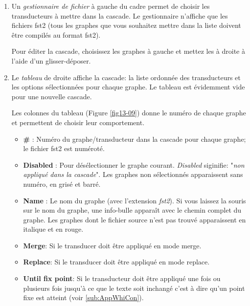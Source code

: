 \begin{enumerate}
	\item Un \textit{gestionnaire de fichier} à gauche du cadre permet de choisir les transducteurs à mettre dans la cascade.
	Le gestionnaire n'affiche que les fichiers fst2 (tous les graphes que vous souhaitez mettre dans la liste doivent être compilés au format fst2).
	
	Pour éditer la cascade, choisissez les graphes à gauche et mettez les à droite à l'aide d'un glisser-déposer.
\item Le \textit{tableau} de droite affiche la cascade: la liste ordonnée des transducteurs et les options sélectionnées pour chaque graphe.
		Le tableau est évidemment vide pour une nouvelle cascade.
		 
		Les colonnes du tableau (Figure \ref{fig13-09}) donne le numéro de chaque graphe et permettent de choisir leur comportement.
	\begin{itemize}
	\item \textbf{\#} : Numéro du graphe/transducteur dans la cascade pour chaque graphe; le fichier fst2 est numéroté.
	\item \textbf{Disabled} : Pour désélectionner le graphe courant. \textit{Disabled} siginifie: "\textit{non appliqué dans la cascade}".
		Les graphes non sélectionnés apparaissent sans numéro, en grisé et barré.
	\item \textbf{Name} : Le nom du graphe (avec l'extension \emph{fst2}). Si vous laissez la souris sur le nom du graphe,
		une info-bulle apparaît avec le chemin complet du graphe.
		Les graphes dont le fichier source n'est pas trouvé apparaissent en italique et en rouge.

	\item \textbf{Merge}: Si le transducer doit être appliqué en mode merge.
	\item \textbf{Replace}: Si le transducer doit être appliqué en mode replace.
	\item \textbf{Until fix point}: Si le transducteur doit être appliqué une fois ou plusieurs fois
		jusqu'à ce que le texte soit inchangé c'est à dire qu'un point fixe est atteint (voir \ref{sub:AppWhiCon}).
	\end{itemize}
	

\end{enumerate}

